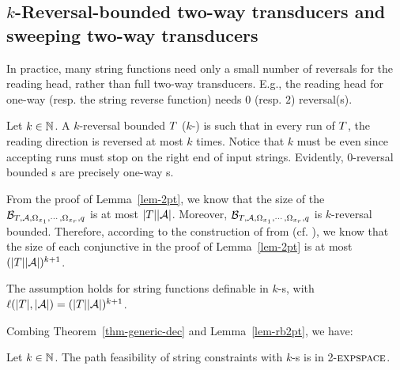 
\subsection{$k$-Reversal-bounded two-way transducers and sweeping two-way transducers} \label{subsec:krb}
 
In practice, many string functions need only a small number of reversals for the reading head, rather than full two-way transducers. 
E.g., the reading head for one-way \PT{} (resp. the string reverse function) needs $0$ (resp. $2$) reversal(s).

Let $k \in \mathbb{N}$. A $k$-reversal bounded \PPT{} $T$ ($k$-\RBPPT{}) is such that in every run of $T$, the reading direction is reversed at most $k$ times. 
Notice that $k$ must be even since accepting runs must stop on the right end of input strings. 
Evidently, $0$-reversal bounded \PPT{}s are precisely one-way \PT{}s.   

From the proof of Lemma~\ref{lem-2pt}, we know that the size of the \FFA{} $\mathcal{B}_{T, \mathcal{A}, \Omega_{x_1}, \cdots, \Omega_{x_r}, q}$  is at most $|T| |\mathcal{A}|$. Moreover, $\mathcal{B}_{T, \mathcal{A}, \Omega_{x_1}, \cdots, \Omega_{x_r}, q}$ is $k$-reversal bounded. Therefore, according to the construction of \FA{} from \FFA{}  (cf. \cite{HU79}), we know that the size of each conjunctive \FA{}  in the proof of Lemma~\ref{lem-2pt} is at most $ (|T||\mathcal{A}|)^{k+1}$. 
%
\begin{lemma}\label{lem-rb2pt}
The \prerec{} assumption holds for string functions definable in $k$-\RBPPT{}s, with $\ell(|T|, |\mathcal{A}|) = (|T||\mathcal{A}|)^{k+1}$.
\end{lemma}

Combing Theorem~\ref{thm-generic-dec} and Lemma~\ref{lem-rb2pt}, we have:

\begin{theorem} \label{thm-rb-2pt}
Let  $k \in \mathbb{N}$. The path feasibility of string constraints with $k$-\RBPPT{}s is in 2-$\textsc{expspace}$. 
\end{theorem}





